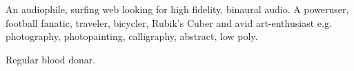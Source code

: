 

\begin{cvparagraph}

  An audiophile, surfing web looking for high fidelity, binaural audio.
  A poweruser, football fanatic, traveler, bicycler, Rubik's Cuber and avid art-enthusiast e.g. photography, photopainting, calligraphy, abstract, low poly.
  \par Regular blood donar.
\end{cvparagraph}  
